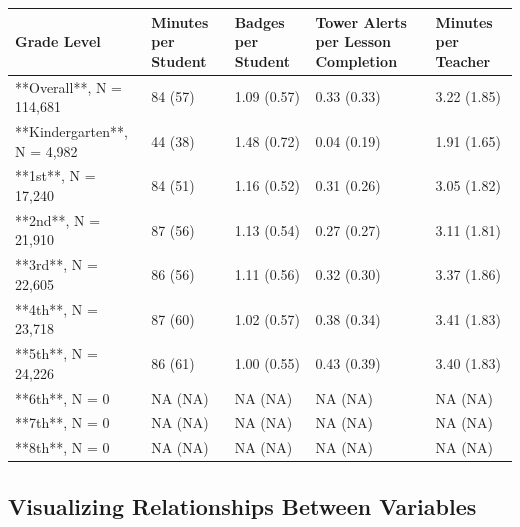 \documentclass[
  number,
  preprint,
  3p,
  onecolumn]{elsarticle}
\begin{document}
\begin{table}

\caption{\label{tbl-summary-statistics}\textbf{?(caption)}}\begin{minipage}[t]{\linewidth}
\subcaption{\label{tbl-summary-statistics-1}}

{\centering 

\begin{longtable*}{lllll}
\toprule
Grade Level & Minutes per Student & Badges per Student & Tower Alerts per Lesson Completion & Minutes per Teacher \\ 
\midrule
**Overall**, N = 114,681 & 84 (57) & 1.09 (0.57) & 0.33 (0.33) & 3.22 (1.85) \\ 
**Kindergarten**, N = 4,982 & 44 (38) & 1.48 (0.72) & 0.04 (0.19) & 1.91 (1.65) \\ 
**1st**, N = 17,240 & 84 (51) & 1.16 (0.52) & 0.31 (0.26) & 3.05 (1.82) \\ 
**2nd**, N = 21,910 & 87 (56) & 1.13 (0.54) & 0.27 (0.27) & 3.11 (1.81) \\ 
**3rd**, N = 22,605 & 86 (56) & 1.11 (0.56) & 0.32 (0.30) & 3.37 (1.86) \\ 
**4th**, N = 23,718 & 87 (60) & 1.02 (0.57) & 0.38 (0.34) & 3.41 (1.83) \\ 
**5th**, N = 24,226 & 86 (61) & 1.00 (0.55) & 0.43 (0.39) & 3.40 (1.83) \\ 
**6th**, N = 0 & NA (NA) & NA (NA) & NA (NA) & NA (NA) \\ 
**7th**, N = 0 & NA (NA) & NA (NA) & NA (NA) & NA (NA) \\ 
**8th**, N = 0 & NA (NA) & NA (NA) & NA (NA) & NA (NA) \\ 
\bottomrule
\end{longtable*}

}

\end{minipage}%

\end{table}

\hypertarget{visualizing-relationships-between-variables}{%
\subsection{Visualizing Relationships Between
Variables}\label{visualizing-relationships-between-variables}}
\end{document}
